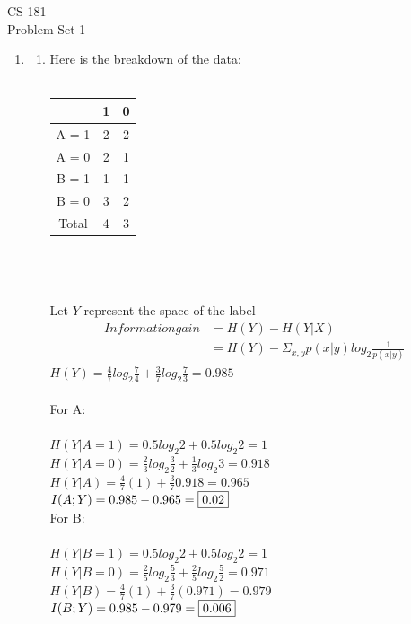 \documentclass[12pt]{article}
\begin{document}
\begin{center}
CS 181\\
Problem Set 1
\end{center}

\begin{enumerate}

	\item 
		\begin{enumerate}
			\item Here is the breakdown of the data:\\\\
				\begin{tabular}{|c|c|c|}
        				\hline
        				~            & 1 & 0 \\ \hline
        				A = 1 & 2      & 2      \\ 
        				A = 0 & 2      & 1      \\
        				\hline
        				B = 1 & 1      & 1      \\ 
        				B = 0 & 3      & 2      \\
        				\hline
					Total & 4      & 3      \\
        				\hline
    				\end{tabular}
\\\\\\Let $Y$ represent the space of the label
				\begin{align*}Information gain &= H(Y) - H(Y|X)\\
							& = H(Y) -\Sigma_{x,y}p(x|y)log_{2}\frac{1}{p(x|y)}\end{align*}
				$H(Y) = \frac{4}{7}log_{2}\frac{7}{4} + \frac{3}{7}log_{2}\frac{7}{3} = 0.985$\\\\
				For A:\\\\
				$H(Y|A = 1) = 0.5log_{2}2 + 0.5log_{2}2 = 1$\\
				$H(Y|A = 0) = \frac{2}{3}log_{2}\frac{3}{2} + \frac{1}{3}log_{2}3 = 0.918$\\
				$H(Y|A) = \frac{4}{7}(1) + \frac{3}{7}0.918 = 0.965$\\
				$I(A ; Y) = 0.985 - 0.965 = \fbox{0.02}$\\

				For B:\\\\
				$H(Y|B = 1) = 0.5log_{2}2 + 0.5log_{2}2 = 1$\\
				$H(Y|B = 0) = \frac{2}{5}log_{2}\frac{5}{3} + \frac{2}{5}log_{2}\frac{5}{2} = 0.971$\\
				$H(Y|B) = \frac{4}{7}(1) + \frac{3}{7}(0.971) = 0.979$\\
				$I(B ; Y) = 0.985 - 0.979 = \fbox{0.006}$\\


\end{enumerate}
\end{enumerate}
\end{document}
